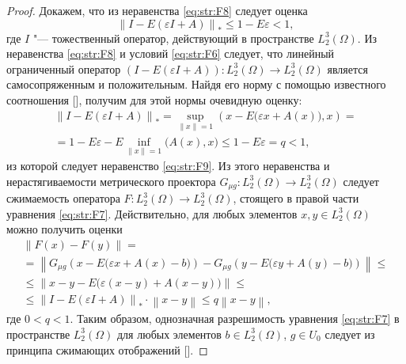 \begin{proof}
Докажем, что из неравенства \eqref{eq:str:F8} следует оценка
\begin{equation}\left\| I-E\left(\varepsilon   I+A\right)\right\| _{*} \le 1-E \varepsilon <1,\label{eq:str:F9}\end{equation}                                            
где $I$ "--- тожественный оператор, действующий в пространстве $L_{2}^{3} (\Omega)$.
Из неравенства \eqref{eq:str:F8} и условий \eqref{eq:str:F6} следует, что линейный ограниченный оператор $\left(I-E\left(\varepsilon   I+A\right)\right)\colon L_{2}^{3} (\Omega)\to L_{2}^{3} (\Omega)$ является самосопряженным и положительным.
Найдя его норму с помощью известного соотношения [], получим для этой нормы очевидную оценку:
\begin{multline*} 
\left\| I-E\left(\varepsilon   I+A\right)\right\| _{*} =\mathop{\sup }\limits_{\left\| x\right\| =1} \left(x-E\bigl(\varepsilon   x+A(x)\bigr), x\right)=  \\  =1-E  \varepsilon -E\mathop{\inf }\limits_{\left\| x\right\| =1} \bigl(A(x), x\bigr)\le 1-E\varepsilon =q<1, 
\end{multline*} 
из которой следует неравенство \eqref{eq:str:F9}.
Из этого неравенства и нерастягиваемости метрического проектора $G_{\mu g} \colon L_{2}^{3} (\Omega)\to L_{2}^{3} (\Omega)$ следует сжимаемость оператора $F\colon L_{2}^{3} (\Omega)\to L_{2}^{3} (\Omega)$, стоящего в правой части уравнения \eqref{eq:str:F7}.
Действительно, для любых элементов $x,y\in L_{2}^{3} (\Omega)$ можно получить оценки
\begin{multline*} 
\left\| F(x)-F(y)\right\| = \\=\left\| G_{\mu g} \left(x-E\bigl(\varepsilon   x+A(x)-b\bigr)\right)-G_{\mu g} \left(y-E\bigl(\varepsilon  y+A(y) -b\bigr)\right)\right\| \le \\ \le  \left\| x-y-E\bigl(\varepsilon  \left(x-y\right)+A\left(x-y\right)\bigr)\right\| \le \\ \le \left\| I-E\left(\varepsilon  I+A\right)\right\| _{*} \cdot \left\| x-y\right\| \le q  \left\| x-y\right\|,  \end{multline*} 
где $0<q<1$.
Таким образом, однозначная разрешимость уравнения \eqref{eq:str:F7} в пространстве $L_{2}^{3} (\Omega)$ для любых элементов $b\in L_{2}^{3} (\Omega)$, $g\in U_{0} $ следует из принципа сжимающих отображений [].


\end{proof}
